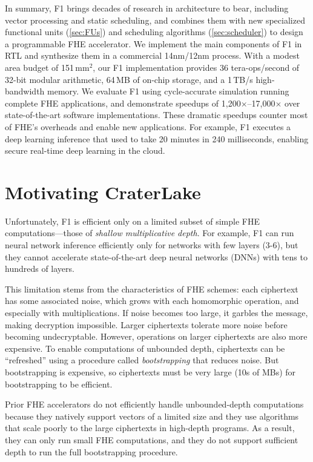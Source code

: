 In summary, F1 brings decades of research in architecture to bear, including
vector processing and static scheduling, and combines them with new specialized
functional units (\autoref{sec:FUs}) and scheduling algorithms
(\autoref{sec:scheduler}) to design a programmable FHE accelerator. We
implement the main components of F1 in RTL and synthesize them in a commercial
14nm/12nm process. With a modest area budget of 151\,mm$^2$, our F1
implementation provides 36 tera-ops/second of 32-bit modular arithmetic, 64\,MB
of on-chip storage, and a 1\,TB/s high-bandwidth memory. We evaluate F1 using
cycle-accurate simulation running complete FHE applications, and demonstrate
speedups of 1,200$\times$--17,000$\times$ over state-of-the-art software
implementations. These dramatic speedups counter most of FHE's overheads and
enable new applications. For example, F1 executes a deep learning inference
that used to take 20 minutes in 240 milliseconds, enabling secure real-time
deep learning in the cloud.

\section{Motivating CraterLake}

Unfortunately, F1 is efficient only on a limited subset of simple FHE
computations---those of \emph{shallow multiplicative depth}. For example, F1
can run neural network inference efficiently only for networks with few layers
(3-6), but they cannot accelerate state-of-the-art deep neural networks (DNNs)
with tens to hundreds of layers.

This limitation stems from the characteristics of FHE schemes: each ciphertext
has some associated noise, which grows with each homomorphic operation, and
especially with multiplications. If noise becomes too large, it garbles the
message, making decryption impossible. Larger ciphertexts tolerate more noise
before becoming undecryptable. However, operations on larger ciphertexts are
also more expensive. To enable computations of unbounded depth, ciphertexts can
be ``refreshed'' using a procedure called \emph{bootstrapping} that reduces
noise. But bootstrapping is expensive, so ciphertexts must be very large (10s
of MBs) for bootstrapping to be efficient.

Prior FHE accelerators do not efficiently handle unbounded-depth computations
because they natively support vectors of a limited size and they use algorithms
that scale poorly to the large ciphertexts in high-depth programs. As a result,
they can only run small FHE computations, and they do not support sufficient
depth to run the full bootstrapping procedure.


